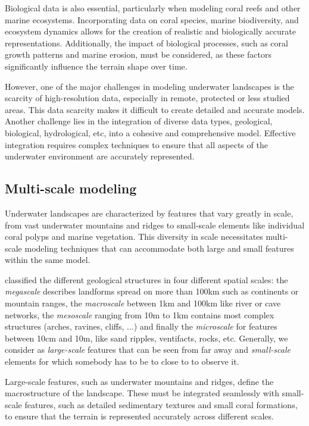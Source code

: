 Biological data is also essential, particularly when modeling coral reefs and other marine ecosystems. Incorporating data on coral species, marine biodiversity, and ecosystem dynamics allows for the creation of realistic and biologically accurate representations. Additionally, the impact of biological processes, such as coral growth patterns and marine erosion, must be considered, as these factors significantly influence the terrain shape over time.

However, one of the major challenges in modeling underwater landscapes is the scarcity of high-resolution data, especially in remote, protected or less studied areas. This data scarcity makes it difficult to create detailed and accurate models. Another challenge lies in the integration of diverse data types, geological, biological, hydrological, etc, into a cohesive and comprehensive model. Effective integration requires complex techniques to ensure that all aspects of the underwater environment are accurately represented.

\subsection{Multi-scale modeling}

Underwater landscapes are characterized by features that vary greatly in scale, from vast underwater mountains and ridges to small-scale elements like individual coral polyps and marine vegetation. This diversity in scale necessitates multi-scale modeling techniques that can accommodate both large and small features within the same model.

\citep{ParisThesis} classified the different geological structures in four different spatial scales: the \textit{megascale} describes landforms spread on more than \si{100}{km} such as continents or mountain ranges, the \textit{macroscale} between \si{1}{km} and \si{100}{km} like river or cave networks, the \textit{mesoscale} ranging from \si{10}{m} to \si{1}{km} contains most complex structures (arches, ravines, cliffs, ...) and finally the \textit{microscale} for features between \si{10}{cm} and \si{10}{m}, like sand ripples, ventifacts, rocks, etc. Generally, we consider as \textit{large-scale} features that can be seen from far away and \textit{small-scale} elements for which somebody has to be to close to to observe it.

Large-scale features, such as underwater mountains and ridges, define the macrostructure of the landscape. These must be integrated seamlessly with small-scale features, such as detailed sedimentary textures and small coral formations, to ensure that the terrain is represented accurately across different scales.

